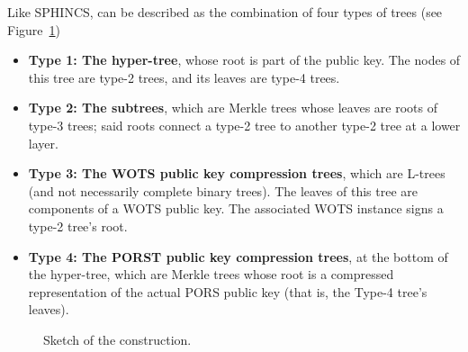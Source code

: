 Like SPHINCS, \gravity can be described as the combination of four types of trees (see Figure~\ref{fig:sphincs_summary})
\begin{itemize}
    
        \item \textbf{Type 1: The hyper-tree}, whose root is part of the public key. The nodes of this tree are type-2 trees, and its leaves are type-4 trees. 
    
        \item \textbf{Type 2: The subtrees}, which are Merkle trees whose leaves are roots of type-3 trees; said roots connect a type-2 tree to another type-2 tree at a lower layer.
    
        \item \textbf{Type 3: The WOTS public key compression trees}, which are L-trees (and not necessarily complete binary trees). The leaves of this tree are components of a WOTS public key. The associated WOTS instance signs a type-2 tree's root.
    
        \item \textbf{Type 4: The PORST public key compression trees}, at the bottom of the hyper-tree, which are Merkle trees whose root is a compressed representation of the actual PORS public key (that is, the Type-4 tree's leaves).

 \end{itemize}

\begin{figure}[t]
\centering

%
\caption{Sketch of the \gravity construction.}
\label{fig:sphincs_summary}
\end{figure}

